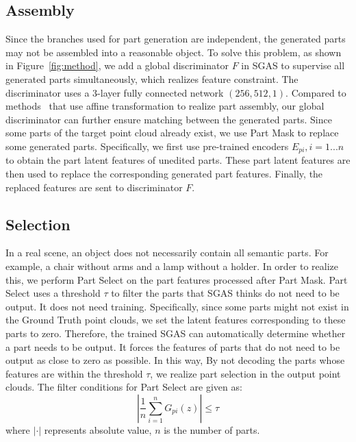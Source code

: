 \documentclass[letterpaper]{article} %
\begin{document}
\subsection{Assembly}

Since the branches used for part generation are independent, the generated parts may not be assembled into a reasonable object. To solve this problem, as shown in Figure~\ref{fig:method}, we add a global discriminator $F$ in SGAS to supervise all generated parts simultaneously, which realizes feature constraint. The discriminator uses a 3-layer fully connected network $(256, 512, 1)$. Compared to methods~\citep{Schor_2019_ICCV,Dubrovina_2019_ICCV,yin2020coalesce,Li_Niu_Xu_2020} that use affine transformation to realize part assembly, our global discriminator can further ensure matching between the generated parts. Since some parts of the target point cloud already exist, we use Part Mask to replace some generated parts. Specifically, we first use pre-trained encoders $E_{pi}, i=1...n$ to obtain the part latent features of unedited parts. These part latent features are then used to replace the corresponding generated part features. Finally, the replaced features are sent to discriminator $F$.

\subsection{Selection}

In a real scene, an object does not necessarily contain all semantic parts. For example, a chair without arms and a lamp without a holder. In order to realize this, we perform Part Select on the part features processed after Part Mask. Part Select uses a threshold $\tau$ to filter the parts that SGAS thinks do not need to be output. It does not need training. Specifically, since some parts might not exist in the Ground Truth point clouds, we set the latent features corresponding to these parts to zero. Therefore, the trained SGAS can automatically determine whether a part needs to be output. It forces the features of parts that do not need to be output as close to zero as possible. In this way, By not decoding the parts whose features are within the threshold $\tau$, we realize part selection in the output point clouds. The filter conditions for Part Select are given as:
\begin{equation}
    \left|\frac{1}{n} \sum_{i=1}^{n} G_{pi}(z)\right| \leq \tau
\end{equation}
where $|\cdot|$ represents absolute value, $n$ is the number of parts.
\end{document}
